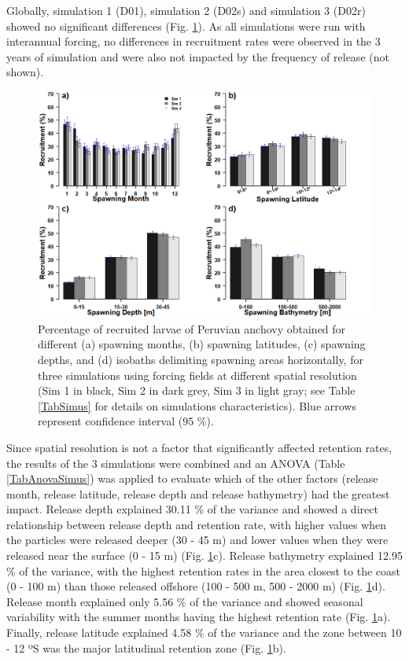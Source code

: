 Globally, simulation 1 (D01), simulation 2 (D02s) and simulation 3 (D02r) showed no significant differences (Fig. \ref{Chap2Recruitment3bars}). As all simulations were run with interannual forcing, no differences in recruitment rates were observed in the 3 years of simulation and were also not impacted by the frequency of release (not shown).\\

\begin{figure}[ht]
	\includegraphics[width=1.0\textwidth]{figures/Chap2Recruitment3bars.png}
	\centering
	\caption{Percentage of recruited larvae of Peruvian anchovy obtained for different (a) spawning months, (b) spawning latitudes, (c) spawning depths, and (d) isobaths delimiting spawning areas horizontally, for three simulations using forcing fields at different spatial resolution (Sim 1 in black, Sim 2 in dark grey, Sim 3 in light gray; see Table \ref{TabSimus} for details on simulations characteristics). Blue arrows represent confidence interval (95 \%).}
	\label{Chap2Recruitment3bars}
\end{figure}

Since spatial resolution is not a factor that significantly affected retention rates, the results of the 3 simulations were combined and an ANOVA (Table \ref{TabAnovaSimus}) was applied to evaluate which of the other factors (release month, release latitude, release depth and release bathymetry) had the greatest impact. Release depth explained 30.11 \% of the variance and showed a direct relationship between release depth and retention rate, with higher values when the particles were released deeper (30 - 45 m) and lower values when they were released near the surface (0 - 15 m) (Fig. \ref{Chap2Recruitment3bars}c). Release bathymetry explained 12.95 \% of the variance, with the highest retention rates in the area closest to the coast (0 - 100 m) than those released offshore (100 - 500 m, 500 - 2000 m) (Fig. \ref{Chap2Recruitment3bars}d). Release month explained only 5.56 \% of the variance and showed seasonal variability with the summer months having the highest retention rate (Fig. \ref{Chap2Recruitment3bars}a). Finally, release latitude explained 4.58 \% of the variance and the zone between 10 - 12 ºS was the major latitudinal retention zone (Fig. \ref{Chap2Recruitment3bars}b).\\

